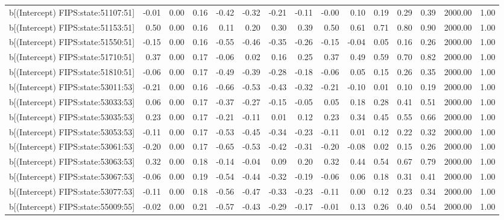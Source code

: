\begin{table}[ht]
\begin{tabular}{rrrrrrrrrrrrrrr}
  b[(Intercept) FIPS:state:51107:51] & -0.01 & 0.00 & 0.16 & -0.42 & -0.32 & -0.21 & -0.11 & -0.00 & 0.10 & 0.19 & 0.29 & 0.39 & 2000.00 & 1.00 \\ 
  b[(Intercept) FIPS:state:51153:51] & 0.50 & 0.00 & 0.16 & 0.11 & 0.20 & 0.30 & 0.39 & 0.50 & 0.61 & 0.71 & 0.80 & 0.90 & 2000.00 & 1.00 \\ 
  b[(Intercept) FIPS:state:51550:51] & -0.15 & 0.00 & 0.16 & -0.55 & -0.46 & -0.35 & -0.26 & -0.15 & -0.04 & 0.05 & 0.16 & 0.26 & 2000.00 & 1.00 \\ 
  b[(Intercept) FIPS:state:51710:51] & 0.37 & 0.00 & 0.17 & -0.06 & 0.02 & 0.16 & 0.25 & 0.37 & 0.49 & 0.59 & 0.70 & 0.82 & 2000.00 & 1.00 \\ 
  b[(Intercept) FIPS:state:51810:51] & -0.06 & 0.00 & 0.17 & -0.49 & -0.39 & -0.28 & -0.18 & -0.06 & 0.05 & 0.15 & 0.26 & 0.35 & 2000.00 & 1.00 \\ 
  b[(Intercept) FIPS:state:53011:53] & -0.21 & 0.00 & 0.16 & -0.66 & -0.53 & -0.43 & -0.32 & -0.21 & -0.10 & 0.01 & 0.10 & 0.19 & 2000.00 & 1.00 \\ 
  b[(Intercept) FIPS:state:53033:53] & 0.06 & 0.00 & 0.17 & -0.37 & -0.27 & -0.15 & -0.05 & 0.05 & 0.18 & 0.28 & 0.41 & 0.51 & 2000.00 & 1.00 \\ 
  b[(Intercept) FIPS:state:53035:53] & 0.23 & 0.00 & 0.17 & -0.21 & -0.11 & 0.01 & 0.12 & 0.23 & 0.34 & 0.45 & 0.55 & 0.66 & 2000.00 & 1.00 \\ 
  b[(Intercept) FIPS:state:53053:53] & -0.11 & 0.00 & 0.17 & -0.53 & -0.45 & -0.34 & -0.23 & -0.11 & 0.01 & 0.12 & 0.22 & 0.32 & 2000.00 & 1.00 \\ 
  b[(Intercept) FIPS:state:53061:53] & -0.20 & 0.00 & 0.17 & -0.65 & -0.53 & -0.42 & -0.31 & -0.20 & -0.08 & 0.02 & 0.15 & 0.26 & 2000.00 & 1.00 \\ 
  b[(Intercept) FIPS:state:53063:53] & 0.32 & 0.00 & 0.18 & -0.14 & -0.04 & 0.09 & 0.20 & 0.32 & 0.44 & 0.54 & 0.67 & 0.79 & 2000.00 & 1.00 \\ 
  b[(Intercept) FIPS:state:53067:53] & -0.06 & 0.00 & 0.19 & -0.54 & -0.44 & -0.32 & -0.19 & -0.06 & 0.06 & 0.18 & 0.31 & 0.41 & 2000.00 & 1.00 \\ 
  b[(Intercept) FIPS:state:53077:53] & -0.11 & 0.00 & 0.18 & -0.56 & -0.47 & -0.33 & -0.23 & -0.11 & 0.00 & 0.12 & 0.23 & 0.34 & 2000.00 & 1.00 \\ 
  b[(Intercept) FIPS:state:55009:55] & -0.02 & 0.00 & 0.21 & -0.57 & -0.43 & -0.29 & -0.17 & -0.01 & 0.13 & 0.26 & 0.40 & 0.54 & 2000.00 & 1.00 \\ 

\end{tabular}
\end{table}
